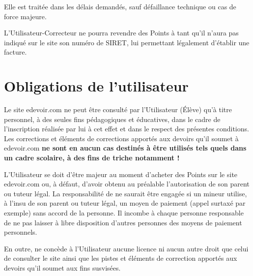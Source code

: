 Elle est traitée dans les délais demandés, sauf défaillance technique ou cas de force majeure.

L'Utilisateur-Correcteur ne pourra revendre des Points à \eDevoir tant qu'il n'aura pas indiqué sur le site son numéro de SIRET, lui permettant légalement d'établir une facture.


\section{Obligations de l'utilisateur}

Le site edevoir.com ne peut être consulté par l'Utilisateur (Élève) qu'à titre personnel, à des seules fins pédagogiques et éducatives, dans le cadre de l'inscription réalisée par lui à cet effet et dans le respect des présentes conditions. Les corrections et éléments de corrections apportés aux devoirs qu'il soumet à edevoir.com \textbf{ne sont en aucun cas destinés à être utilisés tels quels dans un cadre scolaire, à des fins de triche notamment !}

L'Utilisateur se doit d'être majeur au moment d'acheter des Points sur le site edevoir.com ou, à défaut, d'avoir obtenu au préalable l'autorisation de son parent ou tuteur légal. La responsabilité de \eDevoir ne saurait être engagée si un mineur utilise, à l'insu de son parent ou tuteur légal, un moyen de paiement (appel surtaxé par exemple) sans accord de la personne. Il incombe à chaque personne responsable de ne pas laisser à libre disposition d'autres personnes des moyens de paiement personnels.

En outre, \eDevoir ne concède à l'Utilisateur aucune licence ni aucun autre droit que celui de consulter le site ainsi que les pistes et éléments de correction apportés aux devoirs qu'il soumet aux fins susvisées.

